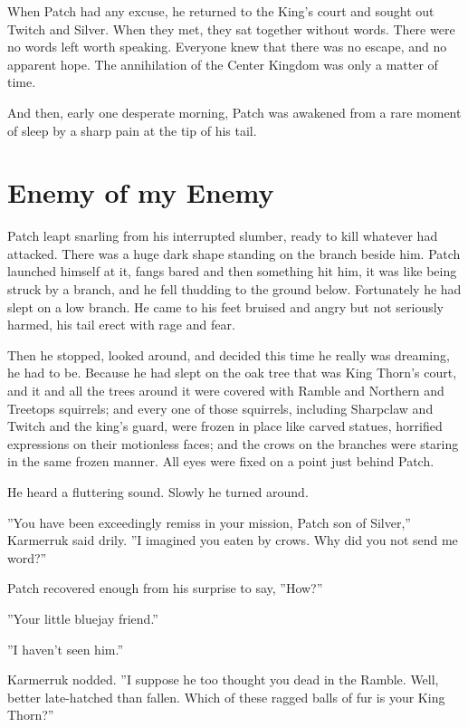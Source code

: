 \documentclass[12pt]{book}
\begin{document}
 When Patch had any excuse, he returned to the King's court and sought out Twitch and Silver. When they met, they sat together without words. There were no words left worth speaking. Everyone knew that there was no escape, and no apparent hope. The annihilation of the Center Kingdom was only a matter of time.\par
 And then, early one desperate morning, Patch was awakened from a rare moment of sleep by a sharp pain at the tip of his tail.\par

\section{Enemy of my Enemy}

 Patch leapt snarling from his interrupted slumber, ready to kill whatever had attacked. There was a huge dark shape standing on the branch beside him. Patch launched himself at it, fangs bared %
 and then something hit him, it was like being struck by a branch, and he fell thudding to the ground below. Fortunately he had slept on a low branch. He came to his feet bruised and angry but not seriously harmed, his tail erect with rage and fear.\par
 Then he stopped, looked around, and decided this time he really was dreaming, he had to be. Because he had slept on the oak tree that was King Thorn's court, and it and all the trees around it were covered with Ramble and Northern and Treetops squirrels; and every one of those squirrels, including Sharpclaw and Twitch and the king's guard, were frozen in place like carved statues, horrified expressions on their motionless faces; and the crows on the branches were staring in the same frozen manner. All eyes were fixed on a point just behind Patch.\par
He heard a fluttering sound. Slowly he turned around.\par
 ''You have been exceedingly remiss in your mission, Patch son of Silver,'' Karmerruk said drily. ''I imagined you eaten by crows. Why did you not send me word?''\par
 Patch recovered enough from his surprise to say, ''How?''\par
 ''Your little bluejay friend.''\par
 ''I haven't seen him.''\par
 Karmerruk nodded. ''I suppose he too thought you dead in the Ramble. Well, better late-hatched than fallen. Which of these ragged balls of fur is your King Thorn?''\par
\end{document}
